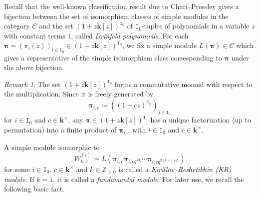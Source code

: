 \documentclass[12pt]{amsart}
\theoremstyle{definition}
\theoremstyle{remark}
\newtheorem{remark}[theorem]{Remark}
\numberwithin{equation}{section}
\begin{document}
Recall that the well-known classification result due to Chari--Pressley \cite[Chapter 12]{CP-1994} gives a bijection between the set of isomorphism classes of simple modules in the category $\mathscr{C}$ and the set $(1+z\mathbf{k}[z])^{\mathtt{I}_0}$ of $\mathtt{I}_0$-tuples of polynomials in a variable $z$ with constant terms $1$, called {\em Drinfeld polynomials}.
For each $\boldsymbol{\pi} = (\pi_{i}(z))_{i \in \mathtt{I}_0} \in(1+z\mathbf{k}[z])^{\mathtt{I}_0}$, we fix a simple module $L( \boldsymbol{\pi}) \in \mathscr{C}$ which gives a representative of the simple isomorphism class corresponding to $ \boldsymbol{\pi}$ under the above bijection.

\begin{remark}
The set $(1+z\mathbf{k}[z])^{\mathtt{I}_0}$ forms a commutative monoid with respect to the multiplication.
Since it is freely generated by 
\[ \boldsymbol{\pi}_{i,c} \coloneqq \left((1-cz)^{\delta_{ij}}\right)_{j \in \mathtt{I}_0}\] for $i \in \mathtt{I}_0$ and $c \in \mathbf{k}^\times$, any $ \boldsymbol{\pi}\in (1+z\mathbf{k}[z])^{\mathtt{I}_0}$ has a unique factorization (up to permutation) into a finite product of $ \boldsymbol{\pi}_{i,c}$ with $i \in \mathtt{I}_0$ and $c \in \mathbf{k}^\times$. 
\end{remark}

  A simple module isomorphic to 
\begin{equation} \label{eq:KR} 
W^{(i)}_{k,c} \coloneqq L( \boldsymbol{\pi}_{i,c} \boldsymbol{\pi}_{i,cq^{2d_i}} \cdots  \boldsymbol{\pi}_{i,cq^{2(k-1)d_i}})
\end{equation}
for some $i \in \mathtt{I}_0$, $c \in \mathbf{k}^\times$ and $k \in \mathbb{Z}_{> 0}$ is called a {\em Kirillov--Reshetikhin  (KR) module}.
If $k=1$,
it is called a  {\em fundamental module}.
For later use, we recall the following basic fact.
\end{document}
